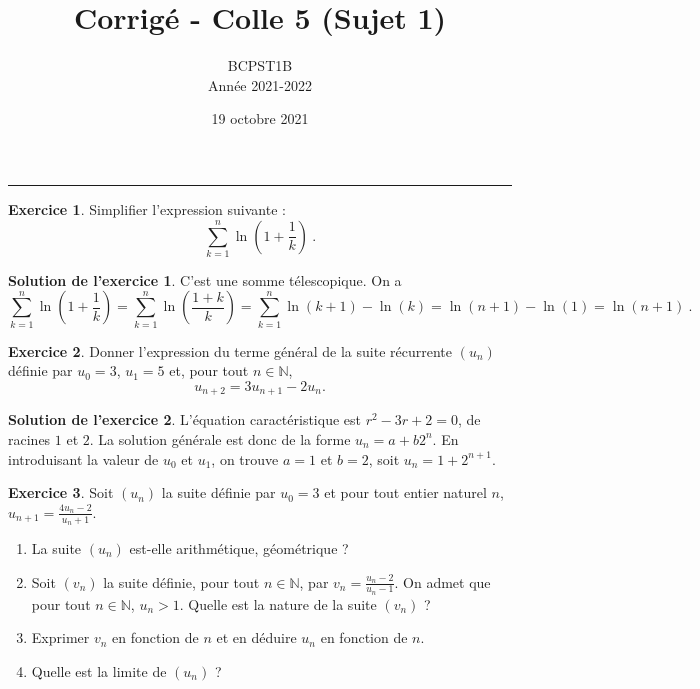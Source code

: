 \documentclass[a4paper, 11pt,openany]{article}%
\title{Corrigé - Colle 5 (Sujet 1)}
\author{BCPST1B\\
Année 2021-2022}
\date{19 octobre 2021}
\theoremstyle{plain}
\theoremstyle{definition}
\newtheorem{exo}{Exercice}
\newtheorem{sol}{Solution de l'exercice}
\theoremstyle{remark}
\newcommand{\N}{\mathbb{N}}
\begin{document}
   \maketitle
      \rule{\linewidth}{0.5mm}


\begin{exo}
	Simplifier l'expression suivante :
	\[
		\sum_{k=1}^n \ln\left(1+ \frac{1}{k}\right) \ .
	\]
\end{exo}

\begin{sol}
C'est une somme télescopique. On a
	\[
		\sum_{k=1}^n \ln\left(1+ \frac{1}{k}\right) = \sum_{k=1}^n \ln\left( \frac{1+k}{k}\right) = \sum_{k=1}^n \ln\left(k+1\right) - \ln(k) = \ln(n+1) - \ln(1) = \ln(n+1) \ .
	\]
\end{sol}

\begin{exo}
Donner l'expression du terme général de la suite récurrente $(u_n)$ définie par $u_0 =3$, $u_1 = 5$ et, pour tout $n \in \N$,
\[ u_{n+2} = 3 u_{n+1} - 2u_n.\]
\end{exo}

\begin{sol}
L'équation caractéristique est $r^2-3r+2=0$, de racines $1$ et $2$. La solution générale est donc de la forme $u_n=a+b2^n$. En introduisant la valeur de $u_0$ et $u_1$, on trouve $a=1$ et $b=2$, soit $u_n=1+2^{n+1}$. 
\end{sol}

   

\begin{exo}
Soit $(u_n)$ la suite définie par $u_0= 3$ et pour tout entier naturel
$n$, $u_{n+1} = \frac{4 u_n - 2}{u_n+1}$.
\begin{enumerate}
\item  La suite $(u_n)$ est-elle arithmétique, géométrique ? 
\item Soit $(v_n)$ la suite définie, pour tout $n \in \N$, par $v_n = \frac{u_n-2}{u_n-1}$. On admet que pour tout $n \in \N$, $u_n > 1$. Quelle est la nature de la suite $(v_n)$ ?
\item Exprimer $v_n$ en fonction de $n$ et en déduire $u_n$ en fonction de $n$.
\item Quelle est la limite de $(u_n)$ ?
\end{enumerate}
\end{exo}
\end{document}
